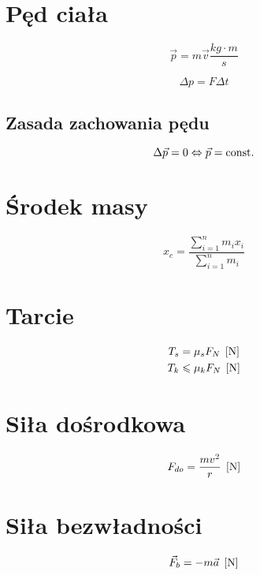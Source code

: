 
\section{Pęd ciała}
\begin{equation}
  \vec p = m \vec v \unit{\frac{kg\cdot m}{s}}
\end{equation}

\begin{equation*}
  \Delta p = F \Delta t
\end{equation*}

\subsection{Zasada zachowania pędu}
\begin{equation*}
  \Delta \vec p = 0 \Leftrightarrow \vec p = \operatorname{const.}
\end{equation*}

\section{Środek masy}
\begin{equation*}
  x_c = \frac{\sum_{i=1}^n m_i x_i}{\sum_{i=1}^n m_i}
\end{equation*}

\section{Tarcie}
\begin{align*}
  T_s &= \mu_s F_N \;\left[\mathrm{N}\right]\\
  T_k &\leqslant \mu_k F_N \;\left[\mathrm{N}\right]
\end{align*}

\section{Siła dośrodkowa}
\begin{equation*}
  F_{do} = \frac{mv^2}{r} \;\left[\mathrm{N}\right]
\end{equation*}

\section{Siła bezwładności}
\begin{equation*}
  \vec F_b = -m \vec a \;\left[\mathrm{N}\right]
\end{equation*}

